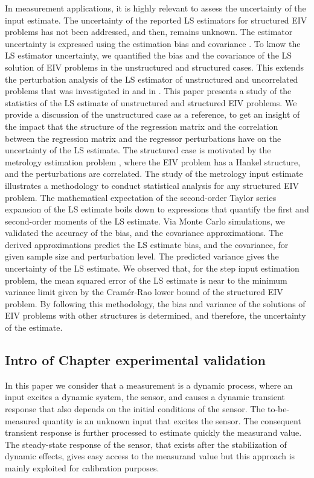  In measurement applications, it is highly relevant to assess the uncertainty of the input estimate.
The uncertainty of the reported LS estimators for structured EIV problems has not been addressed, and then, remains unknown.
The estimator uncertainty is expressed using the estimation bias and covariance \cite{Pintelon12Book}.
To know the LS estimator uncertainty, we quantified the bias and the covariance of the LS solution of EIV problems in the unstructured and structured cases. 
This extends the perturbation analysis of the LS estimator of unstructured and uncorrelated problems that was investigated in \cite{Stewart90SPT} and in \cite{Vaccaro94}.
This paper presents a study of the statistics of the LS estimate of unstructured and structured EIV problems. 
 We provide a discussion of the unstructured case as a reference, to get an insight of the impact that the structure of the regression matrix and the correlation between the regression matrix and the regressor perturbations have on the uncertainty of the LS estimate.
The structured case is motivated by the metrology estimation problem \cite{Markovsky15cep}, where the EIV problem has a Hankel structure, and the perturbations are correlated.
The study of the metrology input estimate illustrates a methodology to conduct statistical analysis for any structured EIV problem.
The mathematical expectation of the second-order Taylor series expansion of the LS estimate boils down to expressions that quantify the first and second-order moments of the LS estimate.
Via Monte Carlo simulations, we validated the accuracy of the bias, and the covariance approximations.
The derived approximations predict the LS estimate bias, and the covariance, for given sample size and perturbation level.
The predicted variance gives the uncertainty of the LS estimate.
We observed that, for the step input estimation problem, the mean squared error of the LS estimate is near to the minimum variance limit given by the Cram\'er-Rao lower bound of the structured EIV problem.
 By following this methodology, the bias and variance of the solutions of EIV problems with other structures is determined, and therefore, the uncertainty of the estimate.


\subsection{Intro of Chapter experimental validation}

 In this paper we consider that a measurement is a dynamic process, where an input excites a dynamic system, the sensor, and causes a dynamic transient response that also depends on the initial conditions of the sensor.
The to-be-measured quantity is an unknown input that excites the sensor.
The consequent transient response is further processed to estimate quickly the measurand value.
The steady-state response of the sensor, that exists after the stabilization of dynamic effects, gives easy access to the measurand value but this approach is mainly exploited for calibration purposes.

